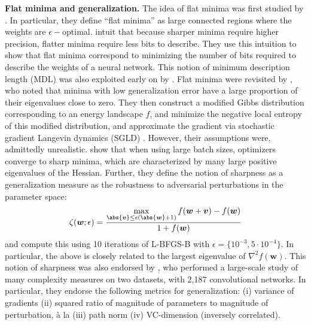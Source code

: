 \textbf{Flat minima and generalization.} The idea of flat minima was first studied by \citet{hochreiter1994simplifying}. In particular, they define ``flat minima'' as large connected regions where the weights are $\epsilon-$optimal. \citet{hochreiter1997flat} intuit that because sharper minima require higher precision, flatter minima require less bits to describe. They use this intuition to show that flat minima correspond to minimizing the number of bits required to describe the weights of a neural network. This notion of minimum description length (MDL) \cite{rissanen1983universal, grunwald2007minimum} was also exploited early on by \citet{hinton1993keeping}. Flat minima were revisited by \citet{chaudhari2019entropy}, who noted that minima with low generalization error have a large proportion of their eigenvalues close to zero. They then construct a modified Gibbs distribution corresponding to an energy landscape $f$, and minimize the negative local entropy of this modified distribution, and approximate the gradient via stochastic gradient Langevin dynamics (SGLD) \cite{welling2011bayesian}. However, their assumptions were, admittedly unrealistic. \citet{keskar2016large} show that when using large batch sizes, optimizers converge to sharp minima, which are characterized by many large positive eigenvalues of the Hessian. Further, they define the notion of sharpness as a generalization measure as the robustness to adversarial perturbations in the parameter space:
\begin{equation}
\zeta(\boldsymbol w; \epsilon) = \frac{\max\limits_{\abs{\boldsymbol v} \leq \epsilon(\abs{\boldsymbol w} + 1)} f(\boldsymbol w + \boldsymbol v) - f(\boldsymbol w)}{1 + f(\boldsymbol w)}
\label{eq:sharpness}
\end{equation}
and compute this using 10 iterations of L-BFGS-B \cite{byrd1995limited} with $\epsilon = \{ 10^{-3}, 5 \cdot 10^{-4} \}$. In particular, the above is closely related to the largest eigenvalue of $\nabla^2 f(\boldsymbol w)$. This notion of sharpness was also endorsed by \citet{jiang2019fantastic}, who performed a large-scale study of many complexity measures on two datasets, with 2,187 convolutional networks. In particular, they endorse the following metrics for generalization: (i) variance of gradients (ii) squared ratio of magnitude of parameters to magnitude of perturbation, à la \citet{keskar2016large} (iii) path norm \cite{neyshabur2017exploring} (iv) VC-dimension (inversely correlated).
    

